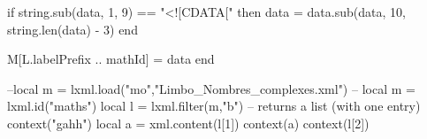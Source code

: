   if string.sub(data, 1, 9) == "<![CDATA[" then data = data.sub(data, 10, string.len(data) - 3) end

  M[L.labelPrefix .. mathId] = data
end 






\startluacode
--local m = lxml.load("mo","Limbo_Nombres_complexes.xml") -- 
local m = lxml.id("maths")
local l = lxml.filter(m,"b") -- returns a list (with one entry)
context("gahh")
local a = xml.content(l[1]) 
context(a)
context(l[2])
\stopluacode


%

